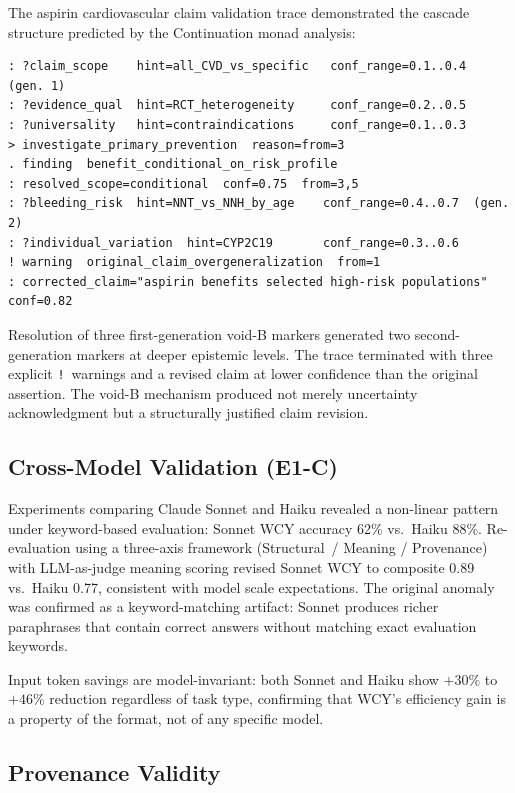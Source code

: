 \documentclass[11pt,a4paper]{article}
\begin{document}
The aspirin cardiovascular claim validation trace demonstrated the cascade structure predicted by the Continuation monad analysis:

\begin{lstlisting}
: ?claim_scope    hint=all_CVD_vs_specific   conf_range=0.1..0.4  (gen. 1)
: ?evidence_qual  hint=RCT_heterogeneity     conf_range=0.2..0.5
: ?universality   hint=contraindications     conf_range=0.1..0.3
> investigate_primary_prevention  reason=from=3
. finding  benefit_conditional_on_risk_profile
: resolved_scope=conditional  conf=0.75  from=3,5
: ?bleeding_risk  hint=NNT_vs_NNH_by_age    conf_range=0.4..0.7  (gen. 2)
: ?individual_variation  hint=CYP2C19       conf_range=0.3..0.6
! warning  original_claim_overgeneralization  from=1
: corrected_claim="aspirin benefits selected high-risk populations"  conf=0.82
\end{lstlisting}

Resolution of three first-generation void-B markers generated two second-generation markers at deeper epistemic levels. The trace terminated with three explicit \texttt{!}~warnings and a revised claim at lower confidence than the original assertion. The void-B mechanism produced not merely uncertainty acknowledgment but a structurally justified claim revision.

\subsection{Cross-Model Validation (E1-C)}
\label{subsec:crossmodel}

Experiments comparing Claude Sonnet and Haiku revealed a non-linear pattern under keyword-based evaluation: Sonnet WCY accuracy 62\% vs.\ Haiku 88\%. Re-evaluation using a three-axis framework (Structural~/ Meaning / Provenance) with LLM-as-judge meaning scoring revised Sonnet WCY to composite 0.89 vs.\ Haiku 0.77, consistent with model scale expectations. The original anomaly was confirmed as a keyword-matching artifact: Sonnet produces richer paraphrases that contain correct answers without matching exact evaluation keywords.

Input token savings are model-invariant: both Sonnet and Haiku show $+30\%$ to $+46\%$ reduction regardless of task type, confirming that WCY's efficiency gain is a property of the format, not of any specific model.

\subsection{Provenance Validity}
\label{subsec:provenance}
\end{document}

